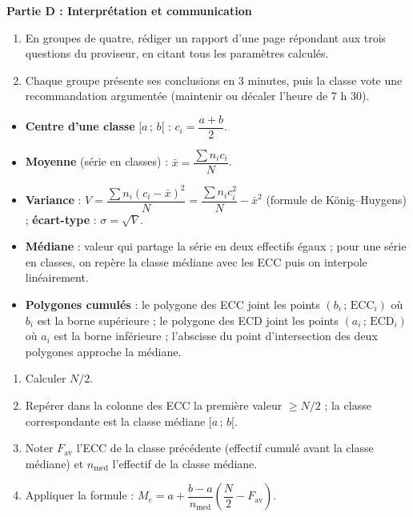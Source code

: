 \documentclass[11pt]{article}
\newcommand{\cle}[1]{{\popxbold\color{popdark}#1}}
\newcounter{popsec}
\newcounter{popsub}
\newcommand{\courssub}[1]{%
  \stepcounter{popsub}%
  \par\vspace{9pt}\noindent{\popxbold\fontsize{11.5}{13}\selectfont\color{popink}{\color{poporange}\thepopsec.\thepopsub}\hspace{6pt}#1}\par\nopagebreak\vspace{4pt}
}
\begin{document}
\textbf{Partie D : Interprétation et communication}

\begin{enumerate}[resume]
\item En groupes de quatre, rédiger un rapport d'une page répondant aux trois questions du proviseur, en citant tous les paramètres calculés.
\item Chaque groupe présente ses conclusions en 3 minutes, puis la classe vote une recommandation argumentée (maintenir ou décaler l'heure de 7 h 30).
\end{enumerate}

\courssub{Ressources à mobiliser}

\begin{aretenir}
\begin{itemize}
\item \textbf{Centre d'une classe} $[a\,;\,b[$ : $c_i=\dfrac{a+b}{2}$.
\item \textbf{Moyenne} (série en classes) : $\bar{x}=\dfrac{\sum n_i c_i}{N}$.
\item \textbf{Variance} : $V=\dfrac{\sum n_i(c_i-\bar{x})^2}{N}=\dfrac{\sum n_i c_i^2}{N}-\bar{x}^2$ (formule de König--Huygens) ; \textbf{écart-type} : $\sigma=\sqrt{V}$.
\item \textbf{Médiane} : valeur qui partage la série en deux effectifs égaux ; pour une série en classes, on repère la classe médiane avec les ECC puis on interpole linéairement.
\item \textbf{Polygones cumulés} : le polygone des ECC joint les points $(b_i\,;\,\mathrm{ECC}_i)$ où $b_i$ est la borne supérieure ; le polygone des ECD joint les points $(a_i\,;\,\mathrm{ECD}_i)$ où $a_i$ est la borne inférieure ; l'abscisse du point d'intersection des deux polygones approche la médiane.
\end{itemize}
\end{aretenir}

\begin{methode}
\begin{enumerate}
\item Calculer $N/2$.
\item Repérer dans la colonne des ECC la première valeur $\ge N/2$ ; la classe correspondante est la \cle{classe médiane} $[a\,;\,b[$.
\item Noter $F_{\text{av}}$ l'ECC de la classe précédente (effectif cumulé avant la classe médiane) et $n_{\text{med}}$ l'effectif de la classe médiane.
\item Appliquer la formule : $M_e = a + \dfrac{b-a}{n_{\text{med}}}\left(\dfrac{N}{2} - F_{\text{av}}\right)$.
\end{enumerate}
\end{methode}
\end{document}
